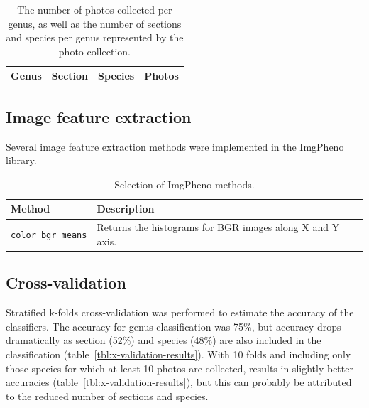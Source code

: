 \documentclass[twocolumn]{bmcart}
\begin{document}
\begin{table}[h]\footnotesize
    \caption{The number of photos collected per genus, as well as the number of sections and species per genus represented by the photo collection.}
    \begin{center}
    \begin{tabular}{llll}
    \toprule
    \textbf{Genus} & \textbf{Section} & \textbf{Species} & \textbf{Photos} \\
    \midrule
    
    \bottomrule
    \end{tabular}
    \end{center}
    \label{tbl:photo-counts}
\end{table}

\subsection{Image feature extraction}

Several image feature extraction methods were implemented in the ImgPheno library.

\begin{table}[h]\footnotesize
    \caption{Selection of ImgPheno methods.}
    \begin{center}
    \begin{tabular}{lp{4cm}}
    \toprule
    \textbf{Method} & \textbf{Description} \\
    \midrule
    \verb/color_bgr_means/ & Returns the histograms for BGR images along X and Y axis. \\
    \bottomrule
    \end{tabular}
    \end{center}
    \label{tbl:imgpheno-methods}
\end{table}

\subsection{Cross-validation}

Stratified k-folds cross-validation was performed to estimate the accuracy of the classifiers. The accuracy for genus classification was 75\%, but accuracy drops dramatically as section (52\%) and species (48\%) are also included in the classification (table~\ref{tbl:x-validation-results}). With 10 folds and including only those species for which at least 10 photos are collected, results in slightly better accuracies (table~\ref{tbl:x-validation-results}), but this can probably be attributed to the reduced number of sections and species.
\end{document}
